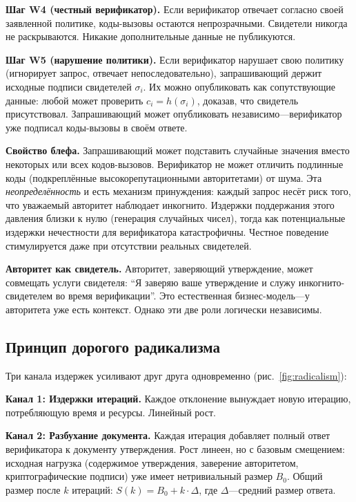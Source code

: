 \documentclass[11pt,a4paper,twocolumn]{article}
\begin{document}
\textbf{Шаг W4 (честный верификатор).} Если верификатор отвечает согласно своей заявленной политике, коды-вызовы остаются непрозрачными. Свидетели никогда не раскрываются. Никакие дополнительные данные не публикуются.

\textbf{Шаг W5 (нарушение политики).} Если верификатор нарушает свою политику (игнорирует запрос, отвечает непоследовательно), запрашивающий держит исходные подписи свидетелей $\sigma_i$. Их можно опубликовать как сопутствующие данные: любой может проверить $c_i = h(\sigma_i)$, доказав, что свидетель присутствовал. Запрашивающий может опубликовать независимо---верификатор уже подписал коды-вызовы в своём ответе.

\textbf{Свойство блефа.} Запрашивающий может подставить случайные значения вместо некоторых или всех кодов-вызовов. Верификатор не может отличить подлинные коды (подкреплённые высокорепутационными авторитетами) от шума. Эта \emph{неопределённость} и есть механизм принуждения: каждый запрос несёт риск того, что уважаемый авторитет наблюдает инкогнито. Издержки поддержания этого давления близки к нулю (генерация случайных чисел), тогда как потенциальные издержки нечестности для верификатора катастрофичны. Честное поведение стимулируется даже при отсутствии реальных свидетелей.

\textbf{Авторитет как свидетель.} Авторитет, заверяющий утверждение, может совмещать услуги свидетеля: ``Я заверяю ваше утверждение и служу инкогнито-свидетелем во время верификации''. Это естественная бизнес-модель---у авторитета уже есть контекст. Однако эти две роли логически независимы.

\subsection{Принцип дорогого радикализма}

Три канала издержек усиливают друг друга одновременно (рис.~\ref{fig:radicalism}):

\textbf{Канал 1: Издержки итераций.} Каждое отклонение вынуждает новую итерацию, потребляющую время и ресурсы. Линейный рост.

\textbf{Канал 2: Разбухание документа.} Каждая итерация добавляет полный ответ верификатора к документу утверждения. Рост линеен, но с базовым смещением: исходная нагрузка (содержимое утверждения, заверение авторитетом, криптографические подписи) уже имеет нетривиальный размер $B_0$. Общий размер после $k$ итераций: $S(k) = B_0 + k \cdot \Delta$, где $\Delta$---средний размер ответа.
\end{document}

